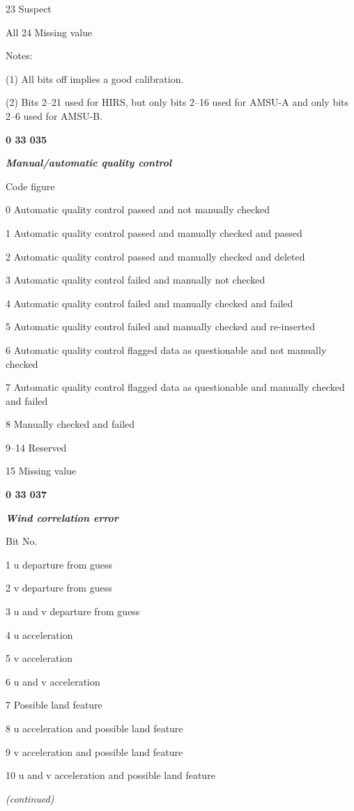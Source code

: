 23 Suspect

All 24 Missing value

Notes:

(1) All bits off implies a good calibration.

(2) Bits 2--21 used for HIRS, but only bits 2--16 used for AMSU-A and only bits 2--6 used for AMSU-B.

\textbf{0 33 035}

\emph{\textbf{Manual/automatic quality control}}

Code figure

0 Automatic quality control passed and not manually checked

1 Automatic quality control passed and manually checked and passed

2 Automatic quality control passed and manually checked and deleted

3 Automatic quality control failed and manually not checked

4 Automatic quality control failed and manually checked and failed

5 Automatic quality control failed and manually checked and re-inserted

6 Automatic quality control flagged data as questionable and not manually checked

7 Automatic quality control flagged data as questionable and manually checked and failed

8 Manually checked and failed

9--14 Reserved

15 Missing value

\textbf{0 33 037}

\emph{\textbf{Wind correlation error}}

Bit No.

1 u departure from guess

2 v departure from guess

3 u and v departure from guess

4 u acceleration

5 v acceleration

6 u and v acceleration

7 Possible land feature

8 u acceleration and possible land feature

9 v acceleration and possible land feature

10 u and v acceleration and possible land feature

\emph{(continued)}

